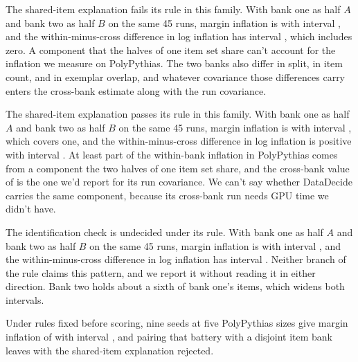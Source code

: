 The shared-item explanation fails its rule in this family. With bank one as half $A$ and bank two as half $B$ on the same 45 runs, margin inflation is  with interval , and the within-minus-cross difference in log inflation has interval , which includes zero. A component that the halves of one item set share can't account for the inflation we measure on PolyPythias. The two banks also differ in split, in item count, and in exemplar overlap, and whatever covariance those differences carry enters the cross-bank estimate along with the run covariance.

The shared-item explanation passes its rule in this family. With bank one as half $A$ and bank two as half $B$ on the same 45 runs, margin inflation is  with interval , which covers one, and the within-minus-cross difference in log inflation is positive with interval . At least part of the within-bank inflation in PolyPythias comes from a component the two halves of one item set share, and the cross-bank value of  is the one we'd report for its run covariance. We can't say whether DataDecide carries the same component, because its cross-bank run needs GPU time we didn't have.

The identification check is undecided under its rule. With bank one as half $A$ and bank two as half $B$ on the same 45 runs, margin inflation is  with interval , and the within-minus-cross difference in log inflation has interval . Neither branch of the rule claims this pattern, and we report it without reading it in either direction. Bank two holds about a sixth of bank one's items, which widens both intervals.


Under rules fixed before scoring, nine seeds at five PolyPythias sizes give margin inflation of  with interval , and pairing that battery with a disjoint item bank leaves  with the shared-item explanation rejected.

